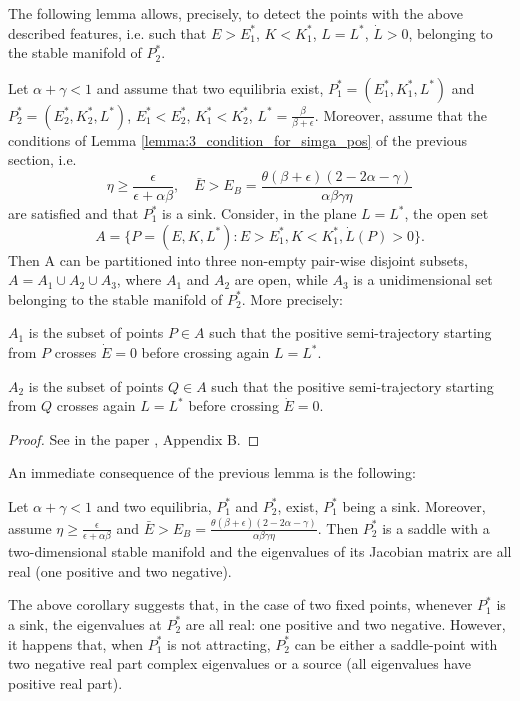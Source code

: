 The following lemma allows, precisely, to detect the points with the above described features, i.e. such that $E > E_1^*$, $K < K_1^*$, $L = L^*$, $\dot{L}>0$, belonging to the stable manifold of $P_2^*$.
\begin{lemma}\label{lemma:7_subdivision_of_phase_space}
	Let $\alpha+\gamma<1$ and assume that two equilibria exist, $P_1^* = (E_1^*, K_1^*, L^*)$ and $P_2^* = (E_2^*, K_2^*, L^*)$, $E_1^* < E_2^*$, $K_1^* < K_2^*$, $L^*=\frac{\beta}{\beta+\epsilon}$. Moreover, assume that the conditions of Lemma \ref{lemma:3_condition_for_simga_pos} of the previous section, i.e. $$\eta\geq \frac{\epsilon}{\epsilon+\alpha\beta},\quad  \bar{E}>E_B=\frac{\theta(\beta+\epsilon)(2-2\alpha-\gamma)}{\alpha\beta\gamma\eta}$$ are satisfied and that $P_1^*$ is a sink. Consider, in the plane $L=L^*$, the open set
	$$A = \{P = (E,K,L^*): E > E_1^*, K < K_1^*, \dot{L}(P)>0\}.$$
	Then A can be partitioned into three non-empty pair-wise disjoint subsets, $A=A_1 \cup A_2 \cup A_3$, where $A_1$ and $A_2$ are open, while $A_3$ is a unidimensional set belonging to the stable manifold of $P_2^*$. More precisely:
	
	$A_1$ is the subset of points $P\in A$ such that the positive semi-trajectory starting from $P$ crosses $\dot{E}=0$ before crossing again $L = L^*$.
	
	$A_2$ is the subset of points $Q\in A$ such that the positive semi-trajectory starting from $Q$ crosses again $L = L^*$ before crossing $\dot{E}=0$.
\end{lemma}
\begin{proof}
	See in the paper \cite{antoci_poverty_2011}, Appendix B.
\end{proof}
An immediate consequence of the previous lemma is the following:
\begin{corollary}
	Let $\alpha+\gamma<1$ and two equilibria, $P_1^*$ and $P_2^*$, exist, $P_1^*$ being a sink. Moreover, assume $\eta\geq \frac{\epsilon}{\epsilon+\alpha\beta}$ and $\bar{E}>E_B=\frac{\theta(\beta+\epsilon)(2-2\alpha-\gamma)}{\alpha\beta\gamma\eta}$. Then $P_2^*$ is a saddle with a two-dimensional stable manifold and the eigenvalues of its Jacobian matrix are all real (one positive and two negative).
\end{corollary}
\begin{remark}
	\textup{The above corollary suggests that, in the case of two fixed points, whenever $P_1^*$ is a sink, the eigenvalues at $P_2^*$ are all real: one positive and two negative. However, it happens that, when $P_1^*$ is not attracting, $P_2^*$ can be either a saddle-point with two negative real part complex eigenvalues or a source (all eigenvalues have positive real part).}
\end{remark}
